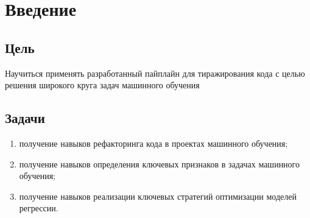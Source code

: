\chapter{Введение}
\label{ch:intro}

\section{Цель}  

Научиться применять разработанный
пайплайн для тиражирования кода с целью решения широкого круга задач
машинного обучения

\section{Задачи} 

\begin{enumerate} 
\item получение навыков рефакторинга кода в проектах машинного
обучения;
\item получение навыков определения ключевых признаков в задачах
машинного обучения;
\item получение навыков реализации ключевых стратегий оптимизации
моделей регрессии.
\end{enumerate}
  

\endinput 